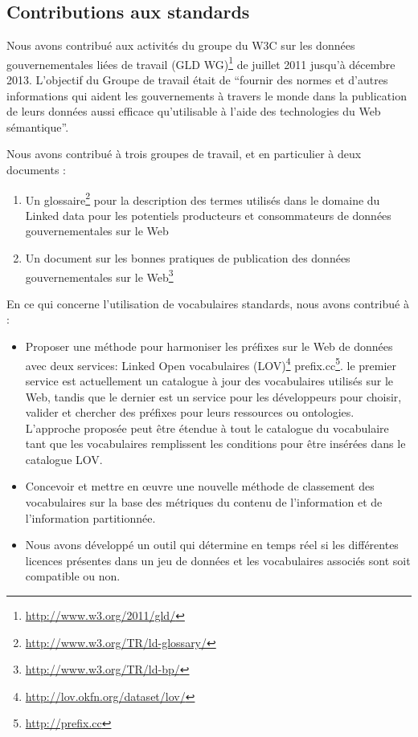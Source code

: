\subsection{Contributions aux standards}
\label{sec:contrib-standard}
Nous avons contribu\'{e} aux activit\'{e}s du groupe du W3C sur les donn\'{e}es gouvernementales li\'{e}es de travail (GLD WG)\footnote{\url{http://www.w3.org/2011/gld/}} de juillet 2011 jusqu'\`{a} d\'{e}cembre 2013. L'objectif du Groupe de travail \'{e}tait de ``fournir des normes et d'autres informations qui aident les gouvernements \`{a} travers le monde dans la publication de leurs donn\'{e}es aussi efficace qu'utilisable \`{a} l'aide des technologies du Web s\'{e}mantique''.

Nous avons contribu\'{e} \`{a} trois groupes de travail, et en particulier \`{a} deux documents :
\begin{enumerate}
 \item Un glossaire\footnote{\url{http://www.w3.org/TR/ld-glossary/}} pour la description des termes utilis\'{e}s dans le domaine du Linked data pour les potentiels producteurs et consommateurs de donn\'{e}es gouvernementales sur le Web
 \item Un document sur les bonnes pratiques de publication des donn\'{e}es gouvernementales sur le Web\footnote{\url{http://www.w3.org/TR/ld-bp/}}
\end{enumerate}

En ce qui concerne l'utilisation de vocabulaires standards, nous avons contribu\'{e} \`{a} :
\begin{itemize}
 \item Proposer une m\'{e}thode pour harmoniser les pr\'{e}fixes sur le Web de donn\'{e}es avec deux services: Linked Open vocabulaires (LOV)\footnote{\url{http://lov.okfn.org/dataset/lov/}} prefix.cc\footnote{\url{http://prefix.cc}}. le premier service est actuellement un catalogue \`{a} jour des vocabulaires utilis\'{e}s sur le Web, tandis que le dernier est un service pour les d\'{e}veloppeurs pour choisir, valider et chercher des pr\'{e}fixes pour leurs ressources ou ontologies. L'approche propos\'{e}e peut \^{e}tre \'{e}tendue \`{a} tout le catalogue du vocabulaire tant que les vocabulaires remplissent les conditions pour \^{e}tre ins\'{e}r\'{e}es dans le catalogue LOV.
 \item Concevoir et mettre en œuvre une nouvelle m\'{e}thode de classement des vocabulaires sur la base des m\'{e}triques du contenu de l'information et de l'information partitionn\'{e}e.
 \item Nous avons d\'{e}velopp\'{e} un outil qui d\'{e}termine en temps r\'{e}el si les diff\'{e}rentes licences pr\'{e}sentes dans un jeu de donn\'{e}es et les vocabulaires associ\'{e}s sont soit compatible ou non.
\end{itemize}

